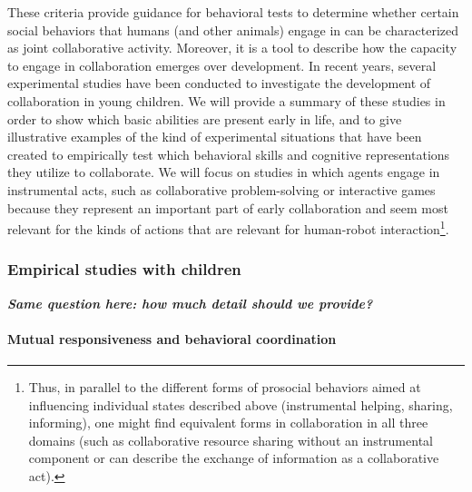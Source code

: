\documentclass{article}
\begin{document}
These criteria provide guidance for behavioral tests to determine whether
certain social behaviors that humans (and other animals) engage in can be
characterized as joint collaborative activity. Moreover, it is a tool to
describe how the capacity to engage in collaboration emerges over development.
In recent years, several experimental studies have been conducted to
investigate the development of collaboration in young children. We will provide
a summary of these studies in order to show which basic abilities are present
early in life, and to give illustrative examples of the kind of experimental
situations that have been created to empirically test which behavioral skills
and cognitive representations they utilize to collaborate. We will focus on
studies in which agents engage in instrumental acts, such as collaborative
problem-solving or interactive games because they represent an important part
of early collaboration and seem most relevant for the kinds of actions that are
relevant for human-robot interaction\footnote{ Thus, in parallel to the
different forms of prosocial behaviors aimed at influencing individual states
described above (instrumental helping, sharing, informing), one might find
equivalent forms in collaboration in all three domains (such as collaborative
resource sharing without an instrumental component or can describe the exchange
of information as a collaborative act).}. 

\subsubsection{Empirical studies with children}

{\bfseries\itshape
Same question here: how much detail should we provide?}

\paragraph{Mutual responsiveness and behavioral coordination}
\end{document}
